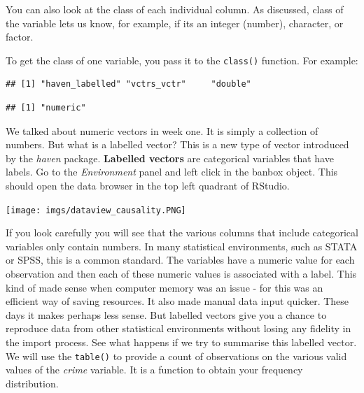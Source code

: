 \documentclass[
]{book}
\newenvironment{Shaded}{\begin{snugshade}}{\end{snugshade}}
\newcommand{\FunctionTok}[1]{\textcolor[rgb]{0.00,0.00,0.00}{#1}}
\newcommand{\NormalTok}[1]{#1}
\newcommand{\SpecialCharTok}[1]{\textcolor[rgb]{0.00,0.00,0.00}{#1}}
\begin{document}
You can also look at the class of each individual column. As discussed, class of the variable lets us know, for example, if its an integer (number), character, or factor.

To get the class of one variable, you pass it to the \texttt{class()} function. For example:

\begin{Shaded}
\end{Shaded}

\begin{verbatim}
## [1] "haven_labelled" "vctrs_vctr"     "double"
\end{verbatim}

\begin{Shaded}
\end{Shaded}

\begin{verbatim}
## [1] "numeric"
\end{verbatim}

We talked about numeric vectors in week one. It is simply a collection of numbers. But what is a labelled vector? This is a new type of vector introduced by the \emph{haven} package. \textbf{Labelled vectors} are categorical variables that have labels. Go to the \emph{Environment} panel and left click in the banbox object. This should open the data browser in the top left quadrant of RStudio.

\texttt{[image: imgs/dataview\_causality.PNG]}

If you look carefully you will see that the various columns that include categorical variables only contain numbers. In many statistical environments, such as STATA or SPSS, this is a common standard. The variables have a numeric value for each observation and then each of these numeric values is associated with a label. This kind of made sense when computer memory was an issue - for this was an efficient way of saving resources. It also made manual data input quicker. These days it makes perhaps less sense. But labelled vectors give you a chance to reproduce data from other statistical environments without losing any fidelity in the import process. See what happens if we try to summarise this labelled vector. We will use the \texttt{table()} to provide a count of observations on the various valid values of the \emph{crime} variable. It is a function to obtain your frequency distribution.
\end{document}
